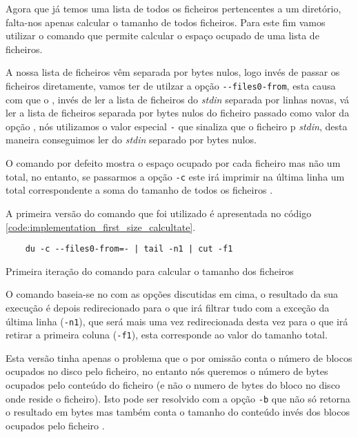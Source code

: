 Agora que já temos uma lista de todos os ficheiros pertencentes a um
diretório, falta-nos apenas calcular o tamanho de todos ficheiros.
Para este fim vamos utilizar o comando  que permite calcular o
espaço ocupado de uma lista de ficheiros.

A nossa lista de ficheiros vêm separada por bytes nulos, logo invés de passar os
ficheiros diretamente, vamos ter de utilzar a opção \Verb|--files0-from|, esta
causa com que o , invés de ler a lista de ficheiros do
\emph{stdin} separada por linhas novas, vá ler a lista de ficheiros separada por
bytes nulos do ficheiro passado como valor da opção \cite{du_man}, nós utilizamos
o valor especial \Verb|-| que sinaliza que o ficheiro p \emph{stdin}, desta
maneira conseguimos ler do \emph{stdin} separado por bytes nulos.

O comando  por defeito mostra o espaço ocupado por cada ficheiro
mas não um total, no entanto, se passarmos a opção \Verb|-c| este irá imprimir
na última linha um total correspondente a soma do tamanho de todos os ficheiros
\cite{du_man}.

A primeira versão do comando que foi utilizado é apresentada no código
\ref{code:implementation_first_size_calcultate}.

\begin{listing}[H]
	\centering
	\begin{verbatim}
    du -c --files0-from=- | tail -n1 | cut -f1
  \end{verbatim}
	\caption{Primeira iteração do comando para calcular o tamanho dos ficheiros}
	\label{code:implementation_first_size_calcultate}
\end{listing}

O comando baseia-se no  com as opções discutidas em cima, o
resultado da sua execução é depois redirecionado para o  que
irá filtrar tudo com a exceção da última linha (\Verb|-n1|), que será mais uma
vez redirecionada desta vez para o  que irá retirar a primeira
coluna (\Verb|-f1|), esta corresponde ao valor do tamanho total.

Esta versão tinha apenas o problema que o  por omissão conta o
número de blocos ocupados no disco pelo ficheiro, no entanto nós queremos o
número de bytes ocupados pelo conteúdo do ficheiro (e não o numero de bytes do
bloco no disco onde reside o ficheiro). Isto pode ser resolvido com a opção
\Verb|-b| que não só retorna o resultado em bytes mas também conta o tamanho do
conteúdo invés dos blocos ocupados pelo ficheiro \cite{du_man}.

